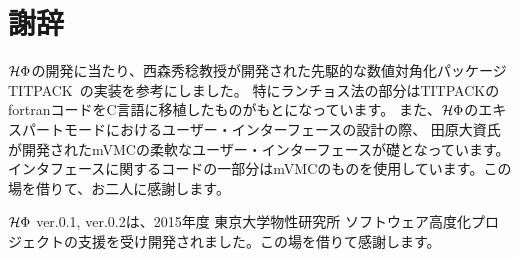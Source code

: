 \chapter{謝辞}
\label{Ch:ack}
$\mathcal{H} \Phi$の開発に当たり、西森秀稔教授が開発された先駆的な数値対角化パッケージTITPACK~\cite{titpack}の実装を参考にしました。
特にランチョス法の部分はTITPACKのfortranコードをC言語に移植したものがもとになっています。
また、$\mathcal{H} \Phi$のエキスパートモードにおけるユーザー・インターフェースの設計の際、
田原大資氏が開発されたmVMCの柔軟なユーザー・インターフェースが礎となっています。
インタフェースに関するコードの一部分はmVMCのものを使用しています。この場を借りて、お二人に感謝します。

$\mathcal{H} \Phi$ ver.0.1, ver.0.2は、2015年度 東京大学物性研究所 ソフトウェア高度化プロジェクトの支援を受け開発されました。この場を借りて感謝します。
